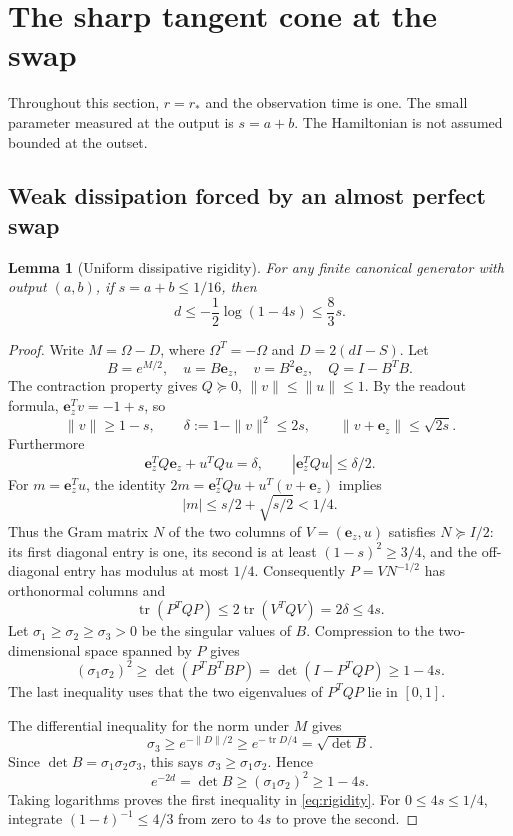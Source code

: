 \documentclass[11pt]{article}
\newtheorem{lemma}[theorem]{Lemma}
\theoremstyle{definition}
\theoremstyle{remark}
\DeclareMathOperator{\tr}{tr}
\newcommand{\ee}{\mathbf e_z}
\newcommand{\PSD}{\succeq0}
\begin{document}
\section{The sharp tangent cone at the swap}\label{sec:swap-cone}

Throughout this section, \(r=r_*\) and the observation time is one. The small parameter measured at the output is \(s=a+b\). The Hamiltonian is not assumed bounded at the outset.

\subsection{Weak dissipation forced by an almost perfect swap}
\begin{lemma}[Uniform dissipative rigidity]\label{lem:rigidity}
For any finite canonical generator with output \((a,b)\), if \(s=a+b\leq1/16\), then
\begin{equation}\label{eq:rigidity}
 d\leq-\frac12\log(1-4s)\leq\frac83s.
\end{equation}
\end{lemma}
\begin{proof}
Write \(M=\Omega-D\), where \(\Omega^T=-\Omega\) and \(D=2(dI-S)\). Let
\[
 B=e^{M/2},\quad u=B\ee,\quad v=B^2\ee,\quad Q=I-B^TB.
\]
The contraction property gives \(Q\PSD\), \(\|v\|\leq\|u\|\leq1\). By the readout formula, \(\ee^Tv=-1+s\), so
\[
 \|v\|\geq1-s,\qquad \delta:=1-\|v\|^2\leq2s,
 \qquad\|v+\ee\|\leq\sqrt{2s}.
\]
Furthermore
\[
 \ee^TQ\ee+u^TQu=\delta,
 \qquad |\ee^TQu|\leq\delta/2.
\]
For \(m=\ee^Tu\), the identity
\(2m=\ee^TQu+u^T(v+\ee)\) implies
\[
 |m|\leq s/2+\sqrt{s/2}<1/4.
\]
Thus the Gram matrix \(N\) of the two columns of \(V=(\ee,u)\) satisfies \(N\succeq I/2\): its first diagonal entry is one, its second is at least \((1-s)^2\geq3/4\), and the off-diagonal entry has modulus at most \(1/4\). Consequently \(P=VN^{-1/2}\) has orthonormal columns and
\[
 \tr(P^TQP)\leq2\tr(V^TQV)=2\delta\leq4s.
\]
Let \(\sigma_1\geq\sigma_2\geq\sigma_3>0\) be the singular values of \(B\). Compression to the two-dimensional space spanned by \(P\) gives
\begin{equation}\label{eq:singular-area}
 (\sigma_1\sigma_2)^2\geq\det(P^TB^TBP)
 =\det(I-P^TQP)\geq1-4s.
\end{equation}
The last inequality uses that the two eigenvalues of \(P^TQP\) lie in \([0,1]\).

The differential inequality for the norm under \(M\) gives
\[
 \sigma_3\geq e^{-\|D\|/2}\geq e^{-\tr D/4}
 =\sqrt{\det B}.
\]
Since \(\det B=\sigma_1\sigma_2\sigma_3\), this says \(\sigma_3\geq\sigma_1\sigma_2\). Hence
\[
 e^{-2d}=\det B\geq(\sigma_1\sigma_2)^2\geq1-4s.
\]
Taking logarithms proves the first inequality in \eqref{eq:rigidity}. For \(0\leq4s\leq1/4\), integrate \((1-t)^{-1}\leq4/3\) from zero to \(4s\) to prove the second.
\end{proof}
\end{document}
